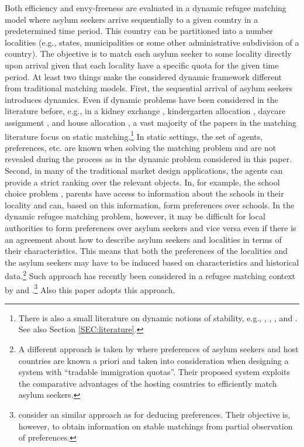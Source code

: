 \documentclass[12pt,fleqn]{article}
\begin{document}
Both efficiency and envy-freeness are evaluated in a dynamic refugee matching model where asylum seekers arrive sequentially to a given country in a predetermined time period. This country can be partitioned into a number localities (e.g., states, municipalities or some other administrative subdivision of a country). The objective is to match each asylum seeker to some locality directly upon arrival given that each locality have a specific quota for the given time period. At least two things make the considered dynamic framework different from traditional matching models. First, the sequential arrival of asylum seekers introduces dynamics. Even if dynamic problems have been considered in the literature before, e.g., in a kidney exchange \citep{bib:Unver}, kindergarten allocation \citep{bib:KennesEtAl2014}, daycare assignment \citep{bib:KennesEtAl2014}, and house allocation \citep{bib:BlochCantala,bib:Kurino}, a vast majority of the papers in the matching literature focus on static matching.\footnote{There is also a small literature on dynamic notions of stability, e.g., \citet{bib:DamianoLam}, \citet{bib:Gudmundsson}, \citet{bib:KadamEtAl2018b}, and \citet{bib:Kurino}. See also Section \ref{SEC:literature}.} In static settings, the set of agents, preferences, etc. are known when solving the matching problem and are not revealed during the process as in the dynamic problem considered in this paper. Second, in many of the traditional market design applications, the agents can provide a strict ranking over the relevant objects. In, for example, the school choice problem \citep{bib:AbdulkadirougluSonmez}, parents have access to information about the schools in their locality and can, based on this information, form preferences over schools. In the dynamic refugee matching problem, however, it may be difficult for local authorities to form preferences over asylum seekers and vice versa even if there is an agreement about how to describe asylum seekers and localities in terms of their characteristics. This means that both the preferences of the localities and the asylum seekers may have to be induced based on characteristics and historical data.\footnote{A different approach is taken by \citet{bib:MoragaEtAl} where preferences of asylum seekers and host countries are known a priori and taken into consideration when designing a system with ``tradable immigration quotas''. Their proposed system exploits the comparative advantages of the hosting countries to efficiently match asylum seekers.} Such approach has recently been considered in a refugee matching context by \citet{bib:AnderssonEhlers} and \citet{bib:BansakEtAl}.\footnote{\citet{bib:HaeringerIehle} consider an similar approach as \citet{bib:AnderssonEhlers} for deducing preferences. Their objective is, however, to obtain information on stable matchings from partial observation of preferences.} Also this paper adopts this approach.
\end{document}
